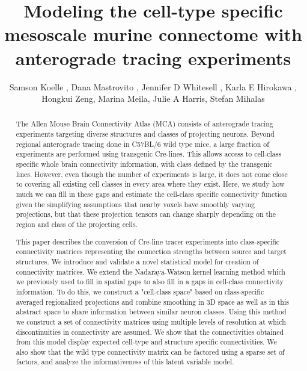 \documentclass[NETN,manuscript]{stjour-new}
\begin{document}
\title{Modeling the cell-type specific mesoscale murine connectome with anterograde tracing experiments}

\author[Koelle et al]%
{Samson Koelle , Dana Mastrovito , Jennifer D Whitesell , Karla E Hirokawa ,  Hongkui Zeng, Marina Meila, Julie A Harris, Stefan Mihalas}





\begin{abstract}
The Allen Mouse Brain Connectivity Atlas (MCA) consists of anterograde tracing experiments targeting diverse structures and classes of projecting neurons.
Beyond regional anterograde tracing done in C57BL/6 wild type mice, a large fraction of experiments are performed using transgenic Cre-lines.
This allows access to cell-class specific whole brain connectivity information, with class defined by the transgenic lines.
However, even though the number of experiments is large, it does not come close to covering all existing cell classes in every area where they exist.
Here, we study how much we can fill in these gaps and estimate the cell-class specific connectivity function given the simplifying assumptions that nearby voxels have smoothly varying projections, but that these projection tensors can change sharply depending on the region and class of the projecting cells.

This paper describes the conversion of Cre-line tracer experiments into class-specific connectivity matrices representing the connection strengths between source and target structures.
We introduce and validate a novel statistical model for creation of connectivity matrices.
We extend the Nadaraya-Watson kernel learning method which we previously used to fill in spatial gaps to also fill in a gaps in cell-class connectivity information.
To do this, we construct a "cell-class space" based on class-specific averaged regionalized projections and combine smoothing in 3D space as well as in this abstract space to share information between similar neuron classes.
Using this method we construct a set of connectivity matrices using multiple levels of resolution at which discontinuities in connectivity are assumed. We show that the connectivities obtained from this model display expected cell-type and structure specific connectivities. 
We also show that the wild type connectivity matrix can be factored using a sparse set of factors, and analyze the informativeness of this latent variable model.

\end{abstract}
\end{document}
